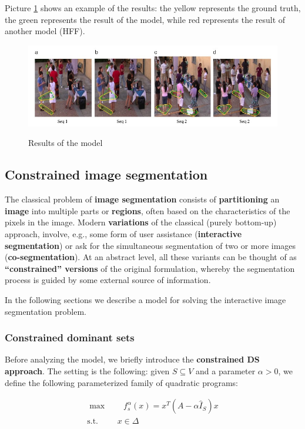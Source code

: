 Picture \ref{groups detection res} shows an example of the results: the yellow represents the ground truth, the green represents the result of the model, while red represents the result of another model (HFF).

\begin{figure}[h!]
    \centering
    \includegraphics[scale = 1.5]{img/groups detection1.jpg}
    \label{groups detection res}
    \caption{Results of the model}
\end{figure}

\subsection{Constrained image segmentation}
The classical problem of \textbf{image segmentation} consists of \textbf{partitioning} an \textbf{image} into multiple parts or \textbf{regions}, often based on the characteristics of the pixels in the image. Modern \textbf{variations} of the classical (purely bottom-up) approach, involve, e.g., some form of user assistance (\textbf{interactive segmentation}) or ask for the simultaneous segmentation of two or more images (\textbf{co-segmentation}). At an abstract level, all these variants can be thought of as \textbf{“constrained” versions} of the original formulation, whereby the segmentation process is guided by some external source of information. 

In the following sections we describe a model for solving the interactive image segmentation problem.

\subsubsection{Constrained dominant sets}
Before analyzing the model, we briefly introduce the \textbf{constrained DS approach}. The setting is the following: given $S \subseteq V$ and a parameter $\alpha > 0$, we define the following parameterized family of quadratic programs:

\begin{equation}\label{CSD}
\begin{array}{lcl}
\max \qquad f_s^{\alpha} (x) = x^T(A - \alpha \hat{I}_S)x \\
\text{s.t. } \qquad x \in \Delta
\end{array}
\end{equation}

